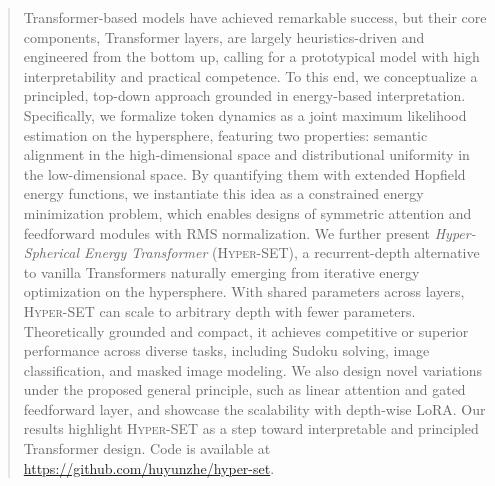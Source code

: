 \begin{abstract}
Transformer-based models have achieved remarkable success, but their core components, Transformer layers, are largely heuristics-driven and engineered from the bottom up, calling for a prototypical model with high interpretability and practical competence. To this end, we conceptualize a principled, top-down approach grounded in energy-based interpretation. Specifically, we formalize token dynamics as a joint maximum likelihood estimation on the hypersphere, featuring two properties: semantic alignment in the high-dimensional space and distributional uniformity in the low-dimensional space. By quantifying them with extended Hopfield energy functions, we instantiate this idea as a constrained energy minimization problem, which enables designs of symmetric attention and feedforward modules with RMS normalization. We further present \emph{Hyper-Spherical Energy Transformer} (\textsc{Hyper-SET}), a recurrent-depth alternative to vanilla Transformers naturally emerging from iterative energy optimization on the hypersphere. With shared parameters across layers, \textsc{Hyper-SET} can scale to arbitrary depth with fewer parameters. Theoretically grounded and compact, it achieves competitive or superior performance across diverse tasks, including Sudoku solving, image classification, and masked image modeling. We also design novel variations under the proposed general principle, such as linear attention and gated feedforward layer, and showcase the scalability with depth-wise LoRA. Our results highlight \textsc{Hyper-SET} as a step toward interpretable and principled Transformer design. Code is available at \href{https://github.com/huyunzhe/hyper-set}{https://github.com/huyunzhe/hyper-set}.
\end{abstract}